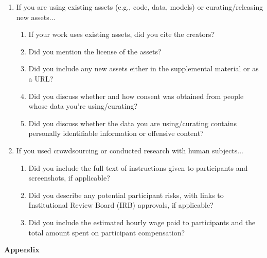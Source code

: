 \documentclass{article}
\theoremstyle{plain}
\theoremstyle{definition}
\theoremstyle{remark}
\begin{document}
\begin{enumerate}
			
			\item If you are using existing assets (e.g., code, data, models) or curating/releasing new assets...
			\begin{enumerate}
				\item If your work uses existing assets, did you cite the creators?
				\answerYes{}
				\item Did you mention the license of the assets?
				\answerNA{}
				\item Did you include any new assets either in the supplemental material or as a URL?
				\answerNA{}
				\item Did you discuss whether and how consent was obtained from people whose data you're using/curating?
				\answerNA{}
				\item Did you discuss whether the data you are using/curating contains personally identifiable information or offensive content?
				\answerNA{}
			\end{enumerate}
			
			
			\item If you used crowdsourcing or conducted research with human subjects...
			\begin{enumerate}
				\item Did you include the full text of instructions given to participants and screenshots, if applicable?
				\answerNA{}
				\item Did you describe any potential participant risks, with links to Institutional Review Board (IRB) approvals, if applicable?
				\answerNA{}
				\item Did you include the estimated hourly wage paid to participants and the total amount spent on participant compensation?
				\answerNA{}
			\end{enumerate}
			
			
		\end{enumerate}
		
		
		\newpage
		
		\appendix
		
		{\LARGE \bf Appendix}
		
		
		
\end{document}
